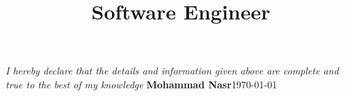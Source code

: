 \documentclass[11pt, a4paper, color, final]{moderncv}
\title{Software Engineer}
\begin{document}
\maketitle











\emptysection{}\closesection{}
\vfill
\textit{I hereby declare that the details and information given above are complete and true to the best of my knowledge}
\linebreak
\textbf{Mohammad Nasr}\hfil\today
\end{document}

